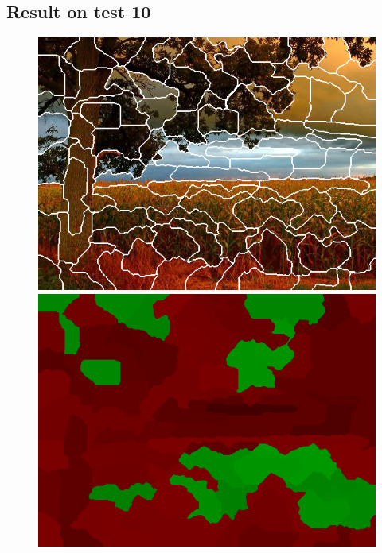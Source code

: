 \documentclass[a4paper,titlepaget]{article}
\begin{document}
\subsection{Result on test 10}
\begin{figure}[htpb] 
	\centering
	\begin{minipage}{.3\textwidth}
		\includegraphics[width=1.7\textwidth]{images/results/10seg} 
	\end{minipage}
	\hspace{.25\textwidth}
	\begin{minipage}{.3\textwidth}
		\includegraphics[width=1.7\textwidth]{images/results/10map}
	\end{minipage}  
\end{figure}
\end{document}
